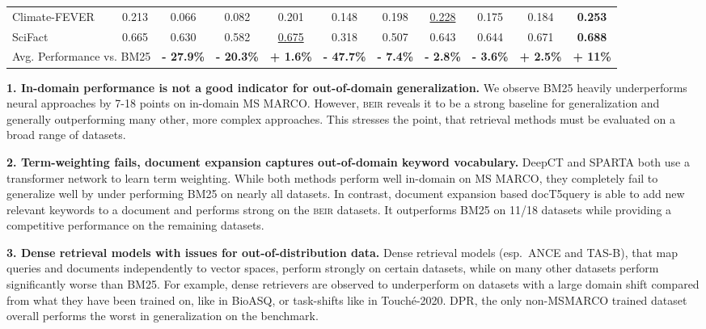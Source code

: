 \documentclass{article}
\newcommand{\custo}[1]{\textsc{\normalsize #1}}
\newcommand{\beir}{\custo{beir}\xspace}
\begin{document}
\begin{table*}[t!]
{\begin{tabular}{l | c | c c c | c c c c | c | c}
   Climate-FEVER & 0.213 & 0.066 & 0.082 & 0.201 & 0.148 & 0.198 & \underline{0.228} & 0.175 & 0.184 & \textbf{0.253}\\ 
   SciFact       & 0.665 & 0.630 & 0.582 & \underline{0.675} & 0.318 & 0.507 & 0.643 & 0.644 & 0.671 & \textbf{0.688} \\ \midrule
   \multicolumn{2}{c|}{Avg. Performance vs. BM25} & \textbf{- 27.9\%} & \textbf{- 20.3\%} & \textbf{+ 1.6\%} & \textbf{- 47.7\%} & \textbf{- 7.4\%} & \textbf{ - 2.8\%} & \textbf{ - 3.6\%} & \textbf{+ 2.5\%} & \textbf{+ 11\%} \\ 
        \bottomrule
    \end{tabular}}
    \caption{In-domain and zero-shot performances on \beir benchmark. All scores denote \textbf{nDCG@10}. The best score on a given dataset is marked in \textbf{bold}, and the second best is \underline{underlined}. Corresponding Recall@100 performances can be found in Table \ref{tab:results-recall}.  indicates the in-domain performances. \vspace{-5mm}}
    \label{tab:results}
\end{table*}

 \textbf{1. In-domain performance is not a good indicator for out-of-domain generalization.} We observe BM25 heavily underperforms neural approaches by 7-18 points on in-domain MS MARCO. However, \beir reveals it to be a strong baseline for generalization and generally outperforming many other, more complex approaches. This stresses the point, that retrieval methods must be evaluated on a broad range of datasets.
 
\textbf{2. Term-weighting fails, document expansion captures out-of-domain keyword vocabulary.}  DeepCT and SPARTA both use a transformer network to learn term weighting. While both methods perform well in-domain on MS MARCO, they completely fail to generalize well by under performing BM25 on nearly all datasets. In contrast, document expansion based docT5query is able to add new relevant keywords to a document and performs strong on the \beir datasets. It outperforms BM25 on 11/18 datasets while providing  a competitive performance on the remaining datasets.  

\textbf{3. Dense retrieval models with issues for out-of-distribution data.} Dense retrieval models (esp.\ ANCE and TAS-B), that map queries and documents independently to vector spaces, perform strongly on certain datasets, while on many other datasets perform significantly worse than BM25. For example, dense retrievers are observed to underperform on datasets with a large domain shift compared from what they have been trained on, like in BioASQ, or task-shifts like in Touch\'e-2020. DPR, the only non-MSMARCO trained dataset overall performs the worst in generalization on the benchmark.
\end{document}
